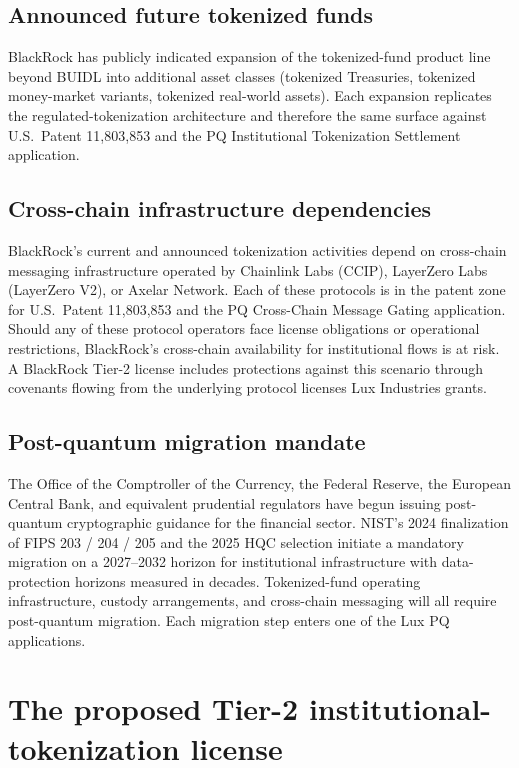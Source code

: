 \documentclass[11pt,letterpaper]{article}
\begin{document}
\subsection{Announced future tokenized funds}

BlackRock has publicly indicated expansion of the tokenized-fund product line beyond BUIDL into additional asset classes (tokenized Treasuries, tokenized money-market variants, tokenized real-world assets). Each expansion replicates the regulated-tokenization architecture and therefore the same surface against U.S.\ Patent 11,803,853 and the PQ Institutional Tokenization Settlement application.

\subsection{Cross-chain infrastructure dependencies}

BlackRock's current and announced tokenization activities depend on cross-chain messaging infrastructure operated by Chainlink Labs (CCIP), LayerZero Labs (LayerZero V2), or Axelar Network. Each of these protocols is in the patent zone for U.S.\ Patent 11,803,853 and the PQ Cross-Chain Message Gating application. Should any of these protocol operators face license obligations or operational restrictions, BlackRock's cross-chain availability for institutional flows is at risk. A BlackRock Tier-2 license includes protections against this scenario through covenants flowing from the underlying protocol licenses Lux Industries grants.

\subsection{Post-quantum migration mandate}

The Office of the Comptroller of the Currency, the Federal Reserve, the European Central Bank, and equivalent prudential regulators have begun issuing post-quantum cryptographic guidance for the financial sector. NIST's 2024 finalization of FIPS 203 / 204 / 205 and the 2025 HQC selection initiate a mandatory migration on a 2027--2032 horizon for institutional infrastructure with data-protection horizons measured in decades. Tokenized-fund operating infrastructure, custody arrangements, and cross-chain messaging will all require post-quantum migration. Each migration step enters one of the Lux PQ applications.

\section{The proposed Tier-2 institutional-tokenization license}
\end{document}
